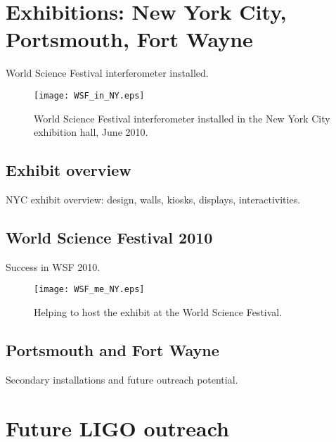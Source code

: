     \section{Exhibitions: New York City, Portsmouth, Fort Wayne}
    \label{exhibitions}

        World Science Festival interferometer installed.

	\begin{figure}
	\begin{center}
	\texttt{[image: WSF\_in\_NY.eps]}
	\caption{World Science Festival interferometer installed in the New York City exhibition hall, June 2010.}
	\label{WSF_IFO_photo}
	\end{center}
	\end{figure}


        \subsection{Exhibit overview}
        \label{exhibit_overview}

            NYC exhibit overview: design, walls, kiosks, displays, interactivities.

        \subsection{World Science Festival 2010}
        \label{WSF2010}

            Success in WSF 2010.

	\begin{figure}
	\begin{center}
	\texttt{[image: WSF\_me\_NY.eps]}
	\caption{Helping to host the exhibit at the World Science Festival.}
	\label{WSF_IFO_me}
	\end{center}
	\end{figure}


        \subsection{Portsmouth and Fort Wayne}
        \label{secondary_installations}

            Secondary installations and future outreach potential.

    \section{Future LIGO outreach}
    \label{future_outreach}

